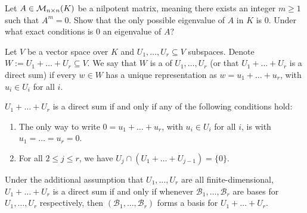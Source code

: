 \begin{exercise}
  \label{exc:nilpotent_matrix_eigenvalues}
  Let $A \in \mathcal{M}_{n \times n}(K)$ be a nilpotent matrix, meaning there exists an integer $m \ge 1$ such that $A^m = 0$. Show that the only possible eigenvalue of $A$ in $K$ is $0$. Under what exact conditions is $0$ an eigenvalue of $A$?
\end{exercise}

\begin{definition}\label{def:direct_sum}
  Let $V$ be a vector space over $K$ and $U_1, \dots, U_r \subseteq V$ subspaces. Denote $W := U_1 + \dots + U_r \subseteq V$. We say that $W$ is a  of $U_1, \dots, U_r$ (or that $U_1 + \dots + U_r$ is a direct sum) if every $w \in W$ has a unique representation as $w = u_1 + \dots + u_r$, with $u_i \in U_i$ for all $i$.
\end{definition}

\begin{exercise}\label{ex:direct_sum_conditions}
  $U_1 + \dots + U_r$ is a direct sum if and only if any of the following conditions hold:
  \begin{enumerate}[label=\textbf{(\alph*)}]
    \item The only way to write $0 = u_1 + \dots + u_r$, with $u_i \in U_i$ for all $i$, is with $u_1 = \dots = u_r = 0$.
    \item For all $2 \le j \le r$, we have $U_j \cap (U_1 + \dots + U_{j-1}) = \{0\}$.
  \end{enumerate}
  Under the additional assumption that $U_1, \dots, U_r$ are all finite-dimensional, $U_1 + \dots + U_r$ is a direct sum if and only if whenever $\mathcal{B}_1, \dots, \mathcal{B}_r$ are bases for $U_1, \dots, U_r$ respectively, then $(\mathcal{B}_1, \dots, \mathcal{B}_r)$ forms a basis for $U_1 + \dots + U_r$.
\end{exercise}

